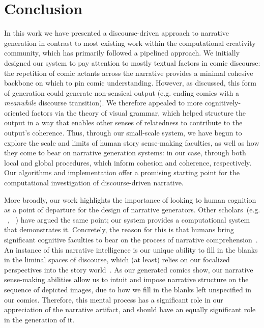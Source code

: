 \section{Conclusion}

In this work we have presented a discourse-driven approach to narrative 
generation in contrast to most existing work within the computational 
creativity community, which has primarily followed a pipelined approach.
We initially designed our system to pay attention to mostly textual
factors in comic discourse: the repetition of comic actants across the
narrative provides a minimal cohesive backbone on which to pin comic 
understanding.
%
However, as discussed, this form of generation could generate non-sensical
output (e.g. ending comics with a \emph{meanwhile} discourse transition). 
We therefore appealed to more cognitively-oriented factors via the theory
of visual grammar, which helped structure the output in a way that enables
other senses of relatedness to contribute to the output's coherence.
%
Thus, through our small-scale system, we have begun to explore the scale and
limits of human story sense-making faculties, as well as how they come to
bear on narrative generation systems: in our case, through both local and 
global procedures, which inform cohesion and coherence, respectively. 
%
Our algorithms and implementation offer a promising starting point for the
computational investigation of discourse-driven narrative.

More broadly, our work highlights the importance of looking to human
cognition as a point of departure for the design of narrative generators.
Other scholars~(e.g.
\citeauthor{gervas2009computational}~\citeyear{gervas2009computational}, 
\citeauthor{szilas2010requirements}~\citeyear{szilas2010requirements})
have argued the same point; our system provides a computational system
that demonstrates it. Concretely, the reason for this is that humans 
bring significant cognitive faculties to bear on the process of narrative 
comprehension~\cite{herman2013storytelling}. 
An instance of this narrative intelligence is our unique ability to fill 
in the blanks in the liminal spaces of discourse, which (at least) relies on  
our focalized perspectives into the story world~\cite{genette1983narrative}.
As our generated comics show, our narrative sense-making abilities allow us 
to intuit and impose narrative structure on the sequence of depicted images, 
due to how we fill in the blanks left unspecified in our comics. Therefore,
this mental process has a significant role in our appreciation of the 
narrative artifact, and should have an equally significant role in the
generation of it.
